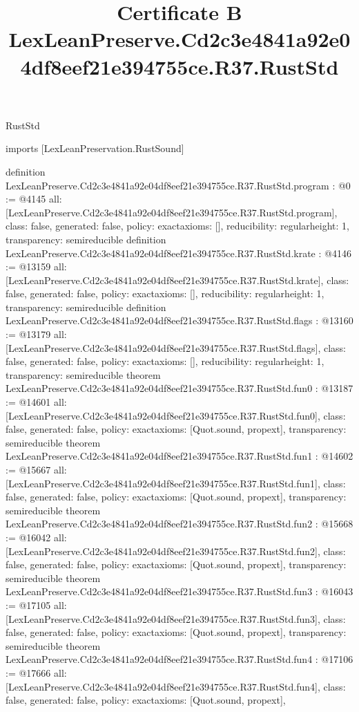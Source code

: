 \begin{lexlean}{RustStd}
\title{Certificate B LexLeanPreserve.Cd2c3e4841a92e04df8eef21e394755ce.R37.RustStd}
\begin{coremodule}
imports [LexLeanPreservation.RustSound]

definition LexLeanPreserve.Cd2c3e4841a92e04df8eef21e394755ce.R37.RustStd.program : @0 := @4145 {
  all: [LexLeanPreserve.Cd2c3e4841a92e04df8eef21e394755ce.R37.RustStd.program],
  class: false,
  generated: false,
  policy: exact{axioms: []},
  reducibility: regular{height: 1},
  transparency: semireducible
}
definition LexLeanPreserve.Cd2c3e4841a92e04df8eef21e394755ce.R37.RustStd.krate : @4146 := @13159 {
  all: [LexLeanPreserve.Cd2c3e4841a92e04df8eef21e394755ce.R37.RustStd.krate],
  class: false,
  generated: false,
  policy: exact{axioms: []},
  reducibility: regular{height: 1},
  transparency: semireducible
}
definition LexLeanPreserve.Cd2c3e4841a92e04df8eef21e394755ce.R37.RustStd.flags : @13160 := @13179 {
  all: [LexLeanPreserve.Cd2c3e4841a92e04df8eef21e394755ce.R37.RustStd.flags],
  class: false,
  generated: false,
  policy: exact{axioms: []},
  reducibility: regular{height: 1},
  transparency: semireducible
}
theorem LexLeanPreserve.Cd2c3e4841a92e04df8eef21e394755ce.R37.RustStd.fun0 : @13187 := @14601 {
  all: [LexLeanPreserve.Cd2c3e4841a92e04df8eef21e394755ce.R37.RustStd.fun0],
  class: false,
  generated: false,
  policy: exact{axioms: [Quot.sound, propext]},
  transparency: semireducible
}
theorem LexLeanPreserve.Cd2c3e4841a92e04df8eef21e394755ce.R37.RustStd.fun1 : @14602 := @15667 {
  all: [LexLeanPreserve.Cd2c3e4841a92e04df8eef21e394755ce.R37.RustStd.fun1],
  class: false,
  generated: false,
  policy: exact{axioms: [Quot.sound, propext]},
  transparency: semireducible
}
theorem LexLeanPreserve.Cd2c3e4841a92e04df8eef21e394755ce.R37.RustStd.fun2 : @15668 := @16042 {
  all: [LexLeanPreserve.Cd2c3e4841a92e04df8eef21e394755ce.R37.RustStd.fun2],
  class: false,
  generated: false,
  policy: exact{axioms: [Quot.sound, propext]},
  transparency: semireducible
}
theorem LexLeanPreserve.Cd2c3e4841a92e04df8eef21e394755ce.R37.RustStd.fun3 : @16043 := @17105 {
  all: [LexLeanPreserve.Cd2c3e4841a92e04df8eef21e394755ce.R37.RustStd.fun3],
  class: false,
  generated: false,
  policy: exact{axioms: [Quot.sound, propext]},
  transparency: semireducible
}
theorem LexLeanPreserve.Cd2c3e4841a92e04df8eef21e394755ce.R37.RustStd.fun4 : @17106 := @17666 {
  all: [LexLeanPreserve.Cd2c3e4841a92e04df8eef21e394755ce.R37.RustStd.fun4],
  class: false,
  generated: false,
  policy: exact{axioms: [Quot.sound, propext]},
}
\end{coremodule}
\end{lexlean}
